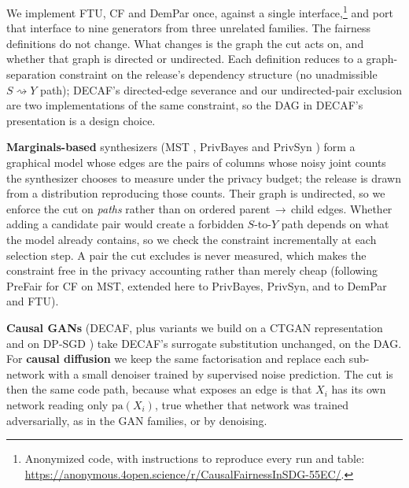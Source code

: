 \documentclass{article}
\begin{document}
We implement FTU, CF and DemPar once, against a single
interface,\footnote{Anonymized code, with instructions to reproduce every run
and table: \url{https://anonymous.4open.science/r/CausalFairnessInSDG-55EC/}.}
and port that interface to nine generators from three unrelated families. The
fairness definitions do not change. What changes is the graph the cut acts on,
and whether that graph is directed or undirected. Each definition reduces to
a graph-separation constraint on the release's dependency structure (no
unadmissible $S \rightsquigarrow Y$ path); DECAF's directed-edge severance and
our undirected-pair exclusion are two implementations of the same constraint,
so the DAG in DECAF's presentation is a design choice.

\textbf{Marginals-based} synthesizers (MST \citep{mckenna2021mst},
PrivBayes \citep{zhang2014privbayes} and PrivSyn \citep{zhang2021privsyn}) form a graphical model
whose edges are the pairs of columns whose noisy joint counts the synthesizer
chooses to measure under the privacy budget; the release is drawn from a
distribution reproducing those counts. Their graph is undirected, so we
enforce the cut on \emph{paths} rather than on ordered
parent\,$\rightarrow$\,child edges. Whether adding a candidate pair would
create a forbidden $S$-to-$Y$ path depends on what the model already
contains, so we check the constraint incrementally at each selection step. A
pair the cut excludes is never measured, which makes the constraint free in
the privacy accounting rather than merely cheap (following
PreFair \citep{pujol2023prefair} for CF on MST, extended here to PrivBayes,
PrivSyn, and to DemPar and FTU).

\textbf{Causal GANs} (DECAF, plus variants we build on a CTGAN
representation \citep{xu2019ctgan} and on DP-SGD \citep{abadi2016dpsgd})
take DECAF's surrogate substitution unchanged, on the DAG. For
\textbf{causal diffusion} we keep the same factorisation and replace each
sub-network with a small denoiser trained by supervised noise prediction. The
cut is then the same code path, because what exposes an edge is that $X_i$ has
its own network reading only $\mathrm{pa}(X_i)$, true whether that network
was trained adversarially, as in the GAN families, or by denoising.
\end{document}
